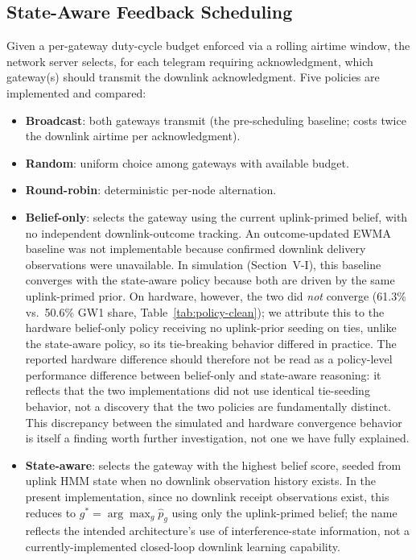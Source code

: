 \documentclass[journal]{IEEEtran}
\begin{document}
\subsection{State-Aware Feedback Scheduling}
\label{sec:scheduling}
Given a per-gateway duty-cycle budget enforced via a rolling airtime window, the network server selects, for each telegram requiring acknowledgment, which gateway(s) should transmit the downlink acknowledgment. Five policies are implemented and compared:
\begin{itemize}
\item \textbf{Broadcast}: both gateways transmit (the pre-scheduling baseline; costs twice the downlink airtime per acknowledgment).
\item \textbf{Random}: uniform choice among gateways with available budget.
\item \textbf{Round-robin}: deterministic per-node alternation.
\item \textbf{Belief-only}: selects the gateway using the current uplink-primed belief, with no independent downlink-outcome tracking. An outcome-updated EWMA baseline was not implementable because confirmed downlink delivery observations were unavailable. In simulation (Section~V-I), this baseline converges with the state-aware policy because both are driven by the same uplink-primed prior. On hardware, however, the two did \emph{not} converge (61.3\% vs.\ 50.6\% GW1 share, Table~\ref{tab:policy-clean}); we attribute this to the hardware belief-only policy receiving no uplink-prior seeding on ties, unlike the state-aware policy, so its tie-breaking behavior differed in practice. The reported hardware difference should therefore not be read as a policy-level performance difference between belief-only and state-aware reasoning: it reflects that the two implementations did not use identical tie-seeding behavior, not a discovery that the two policies are fundamentally distinct. This discrepancy between the simulated and hardware convergence behavior is itself a finding worth further investigation, not one we have fully explained.
\item \textbf{State-aware}: selects the gateway with the highest belief score, seeded from uplink HMM state when no downlink observation history exists. In the present implementation, since no downlink receipt observations exist, this reduces to $g^* = \arg\max_g \hat{p}_g$ using only the uplink-primed belief; the name reflects the intended architecture's use of interference-state information, not a currently-implemented closed-loop downlink learning capability.
\end{itemize}
\end{document}
